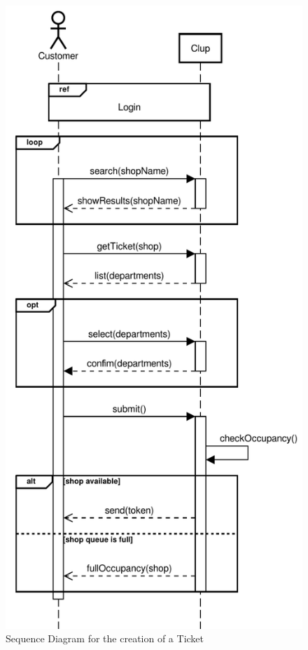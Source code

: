 \begin{figure}[H]
    \centering
    \includegraphics[scale=0.9]{Images/Sequence/ticket_sequence_straight.pdf}
    \caption{Sequence Diagram for the creation of a Ticket}
\end{figure}
